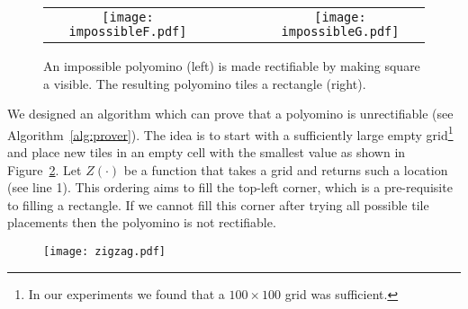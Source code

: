 \documentclass[10pt,a4paper]{article}
\theoremstyle{definition}
\begin{document}
\begin{figure}[!htpb]
\centering
\begin{tabular}{ccc}
\texttt{[image: impossibleF.pdf]} & ~~~~ & \texttt{[image: impossibleG.pdf]}
\end{tabular}
\caption{An impossible polyomino (left) is made rectifiable by making square a visible. The resulting polyomino tiles a rectangle (right).}
\label{fig:impossible2}
\end{figure}


We designed an algorithm which can prove that a polyomino is unrectifiable (see Algorithm~\ref{alg:prover}).
The idea is to start with a sufficiently large empty grid\footnote{In our experiments we found that a $100 \times 100$ grid was sufficient.}
and place new tiles in an empty cell with the smallest value as shown in Figure~\ref{fig:zigzag}. Let $Z(\cdot)$
be a function that takes a grid and returns such a location (see line 1).
This ordering aims to fill the top-left corner, which is a pre-requisite to filling a rectangle.
If we cannot fill this corner after trying all possible tile
placements then the polyomino is not rectifiable.


\begin{figure}[!htpb]
\centering
\texttt{[image: zigzag.pdf]}
\caption{}
\label{fig:zigzag}
\end{figure}
\end{document}
